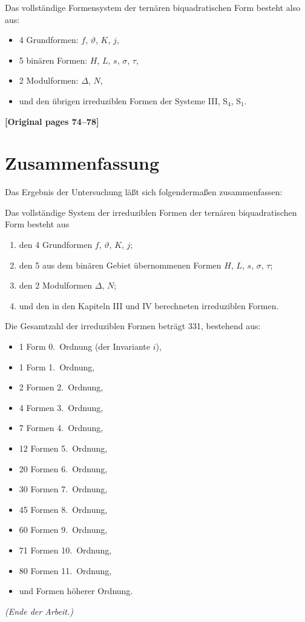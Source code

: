\documentclass[12pt,a4paper]{article}
\begin{document}
Das vollständige Formensystem der ternären biquadratischen Form besteht also aus:
\begin{itemize}
\item 4 Grundformen: $f$, $\vartheta$, $K$, $j$,
\item 5 binären Formen: $H$, $L$, $s$, $\sigma$, $\tau$,
\item 2 Modulformen: $\varDelta$, $N$,
\item und den übrigen irreduziblen Formen der Systeme III, S$_4$, S$_1$.
\end{itemize}

\noindent\textbf{[Original pages 74--78]}

\section*{Zusammenfassung}

Das Ergebnis der Untersuchung läßt sich folgendermaßen zusammenfassen:

Das vollständige System der irreduziblen Formen der ternären biquadratischen Form besteht aus
\begin{enumerate}
\item den 4 Grundformen $f$, $\vartheta$, $K$, $j$;
\item den 5 aus dem binären Gebiet übernommenen Formen $H$, $L$, $s$, $\sigma$, $\tau$;
\item den 2 Modulformen $\varDelta$, $N$;
\item und den in den Kapiteln III und IV berechneten irreduziblen Formen.
\end{enumerate}

Die Gesamtzahl der irreduziblen Formen beträgt 331, bestehend aus:
\begin{itemize}
\item 1 Form 0.\ Ordnung (der Invariante $i$),
\item 1 Form 1.\ Ordnung,
\item 2 Formen 2.\ Ordnung,
\item 4 Formen 3.\ Ordnung,
\item 7 Formen 4.\ Ordnung,
\item 12 Formen 5.\ Ordnung,
\item 20 Formen 6.\ Ordnung,
\item 30 Formen 7.\ Ordnung,
\item 45 Formen 8.\ Ordnung,
\item 60 Formen 9.\ Ordnung,
\item 71 Formen 10.\ Ordnung,
\item 80 Formen 11.\ Ordnung,
\item und Formen höherer Ordnung.
\end{itemize}

\vspace{2em}
\begin{flushright}
\textit{(Ende der Arbeit.)}
\end{flushright}
\end{document}
